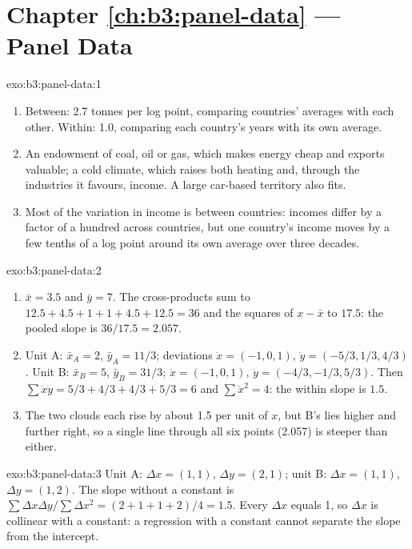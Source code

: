 \section*{Chapter \ref{ch:b3:panel-data} --- Panel Data}

\begin{solution}{exo:b3:panel-data:1}
\begin{enumerate}
\item Between: 2.7 tonnes per log point, comparing countries' averages with each
other. Within: 1.0, comparing each country's years with its own average.
\item An endowment of coal, oil or gas, which makes energy cheap and exports
valuable; a cold climate, which raises both heating and, through the
industries it favours, income. A large car-based territory also fits.
\item Most of the variation in income is between countries: incomes differ by a
factor of a hundred across countries, but one country's income moves by a few
tenths of a log point around its own average over three decades.
\end{enumerate}
\end{solution}

\begin{solution}{exo:b3:panel-data:2}
\begin{enumerate}
\item $\bar x = 3.5$ and $\bar y = 7$. The cross-products sum to $12.5 + 4.5 + 1
+ 1 + 4.5 + 12.5 = 36$ and the squares of $x - \bar x$ to $17.5$: the pooled
slope is $36/17.5 = 2.057$.
\item Unit A: $\bar x_A = 2$, $\bar y_A = 11/3$; deviations $\ddot x = (-1, 0,
1)$, $\ddot y = (-5/3, 1/3, 4/3)$. Unit B: $\bar x_B = 5$, $\bar y_B = 31/3$;
$\ddot x = (-1, 0, 1)$, $\ddot y = (-4/3, -1/3, 5/3)$. Then $\sum \ddot x \ddot
y = 5/3 + 4/3 + 4/3 + 5/3 = 6$ and $\sum \ddot x^2 = 4$: the within slope is
$1.5$.
\item The two clouds each rise by about 1.5 per unit of $x$, but B's lies
higher and further right, so a single line through all six points (2.057) is
steeper than either.
\end{enumerate}
\end{solution}

\begin{solution}{exo:b3:panel-data:3}
Unit A: $\Delta x = (1, 1)$, $\Delta y = (2, 1)$; unit B: $\Delta x = (1, 1)$,
$\Delta y = (1, 2)$. The slope without a constant is $\sum \Delta x \Delta y /
\sum \Delta x^2 = (2 + 1 + 1 + 2)/4 = 1.5$. Every $\Delta x$ equals 1, so
$\Delta x$ is collinear with a constant: a regression with a constant cannot
separate the slope from the intercept.
\end{solution}

